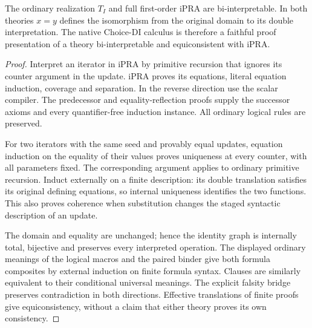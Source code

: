\begin{theorem}
The ordinary realization $T_I$ and full first-order iPRA are
bi-interpretable. In both theories $x=y$ defines the isomorphism from
the original domain to its double interpretation. The native Choice-DI
calculus is therefore a faithful proof presentation of a theory
bi-interpretable and equiconsistent with iPRA.
\end{theorem}
\begin{proof}
Interpret an iterator in iPRA by primitive recursion that ignores its
counter argument in the update. iPRA proves its equations, literal
equation induction, coverage and separation. In the reverse direction
use the scalar compiler. The predecessor and equality-reflection proofs
supply the successor axioms and every quantifier-free induction instance.
All ordinary logical rules are preserved.

For two iterators with the same seed and provably equal updates,
equation induction on the equality of their values proves uniqueness at
every counter, with all parameters fixed. The corresponding argument
applies to ordinary primitive recursion. Induct externally on a finite
description: its double translation satisfies its original defining
equations, so internal uniqueness identifies the two functions. This
also proves coherence when substitution changes the staged syntactic
description of an update.

The domain and equality are unchanged; hence the identity graph is
internally total, bijective and preserves every interpreted operation.
The displayed ordinary meanings of the logical macros and the paired
binder give both formula composites by external induction on finite
formula syntax. Clauses are similarly equivalent to their conditional
universal meanings. The explicit falsity bridge preserves contradiction
in both directions. Effective translations of finite proofs give
equiconsistency, without a claim that either theory proves its own
consistency.
\end{proof}
